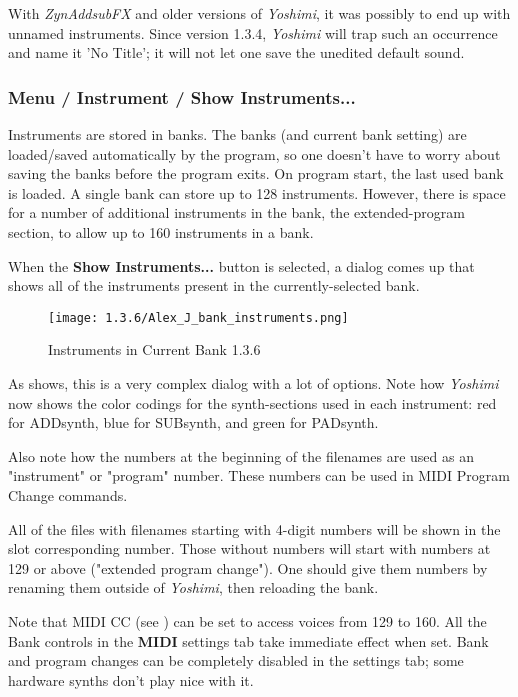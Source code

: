    With \textsl{ZynAddsubFX} and older versions of \textsl{Yoshimi},
   it was possibly to end up with unnamed instruments. Since version
   1.3.4, \textsl{Yoshimi} will trap such an occurrence and name it
   'No Title'; it will not let one save the unedited default sound.

\subsubsection{Menu / Instrument / Show Instruments...}
\label{subsubsec:menu_instrument_show}

   Instruments are stored in banks. The banks (and current bank setting)
   are loaded/saved
   automatically by the program, so one doesn't have to worry about saving the
   banks before the program exits. On program start, the last used bank is
   loaded. A single bank can store up to 128 instruments. 
   However, there is space for a number of additional
   instruments in the bank, the extended-program section, to allow up to 160
   instruments in a bank.

   When the \textbf{Show Instruments...} button is selected, a dialog comes
   up that shows all of the instruments present in the currently-selected
   bank.
   
\begin{figure}[H]
   \centering 
   \texttt{[image: 1.3.6/Alex\_J\_bank\_instruments.png]}
   \caption[Instruments in Current Bank]{Instruments in Current Bank 1.3.6}
   \label{fig:show_alex_j_bank}
\end{figure}

   As 
   shows, this is a very complex dialog with a lot of options.
   Note how \textsl{Yoshimi} now shows the color codings for the
   synth-sections used in each instrument:
   red for ADDsynth, blue for SUBsynth, and
   green for PADsynth.

   Also note how the numbers at the beginning of the filenames are used as
   an "instrument" or "program" number.  These numbers can be used in MIDI
   Program Change commands.
   
   All of the files with filenames starting with 4-digit numbers will be
   shown in the slot corresponding number.  Those without numbers will start
   with numbers at 129 or above ("extended program change").  One should give
   them numbers by renaming them outside of \textsl{Yoshimi}, then reloading
   the bank.

   Note that MIDI CC
   (see )
   can be set to access voices from 129 to 160.
   All the Bank controls in the \textbf{MIDI} settings tab take immediate
   effect when set.
   Bank and program changes can be completely disabled in the settings tab;
   some hardware synths don't play nice with it.


